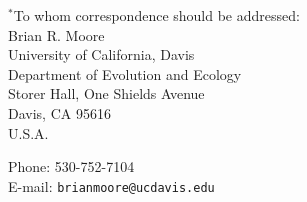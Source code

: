\documentclass[11pt]{article}
\begin{document}
\begin{titlepage}
\begin{flushleft}
$^{\ast}$To whom correspondence should be addressed: \\
Brian R. Moore \\
\vspace{-0.4\baselineskip}
University of California, Davis \\ 
\vspace{-0.4\baselineskip}
Department of Evolution and Ecology \\
\vspace{-0.4\baselineskip}
Storer Hall, One Shields Avenue \\
\vspace{-0.4\baselineskip}
Davis, CA 95616 \\
\vspace{-0.4\baselineskip}
\mbox{U.S.A.}

Phone: 530-752-7104 \\
\vspace{-0.4\baselineskip}
E-mail: {\tt brianmoore@ucdavis.edu} \\
\end{flushleft}

\end{titlepage}

\newpage
\end{document}
